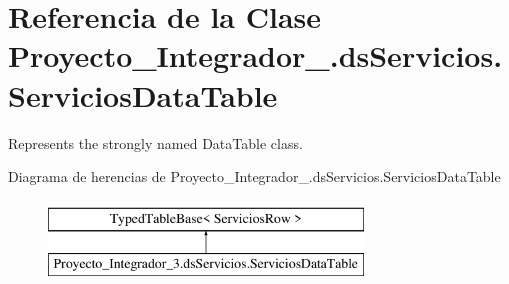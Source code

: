 \hypertarget{class_proyecto___integrador__3_1_1ds_servicios_1_1_servicios_data_table}{\section{Referencia de la Clase Proyecto\-\_\-\-Integrador\-\_.\-ds\-Servicios.\-Servicios\-Data\-Table}
\label{class_proyecto___integrador__3_1_1ds_servicios_1_1_servicios_data_table}
}


Represents the strongly named Data\-Table class.  


Diagrama de herencias de Proyecto\-\_\-\-Integrador\-\_.\-ds\-Servicios.\-Servicios\-Data\-Table\begin{figure}[H]
\begin{center}
\leavevmode
\includegraphics[height=2.000000cm]{dd/d4f/class_proyecto___integrador__3_1_1ds_servicios_1_1_servicios_data_table}
\end{center}
\end{figure}
